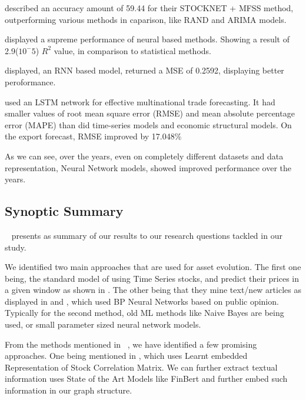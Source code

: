 \documentclass[11pt]{article}
\begin{document}
\cite{haq2021} described an accuracy amount of 59.44 for their STOCKNET + MFSS method, outperforming various methods in caparison, like RAND and ARIMA models.

\cite{Li2020} displayed a supreme performance of neural based methods. Showing a result of 2.9($10^-5$) $R^2$ value, in comparison to statistical methods.

\cite{qiu2020} displayed, an RNN based model, returned a MSE of 0.2592, displaying better peroformance. 

 \cite{shen2021} used an LSTM network for effective multinational trade forecasting. It had smaller values of root mean square error (RMSE) and mean absolute percentage error (MAPE) than did time-series models and economic structural models. On the export forecast, RMSE improved by 17.048\%

 As we can see, over the years, even on completely different datasets and data representation, Neural Network models, showed improved performance over the years.

 \subsection{Synoptic Summary}
~ presents as summary of our results to our research questions tackled in our study.

We identified two main approaches that are used for asset evolution. The first one being, the standard model of using Time Series stocks, and predict their prices in a given window as shown in \cite{dhafer2021}. The other being that they mine text/new articles as displayed in \cite{Gidfalvi2001UsingNA} and \cite{dhafer2021}, which used BP Neural Networks based on public opinion. Typically for the second method, old ML methods like Naive Bayes are being used, or small parameter sized neural network models.

From the methods mentioned in ~, we have identified a few promising approaches. One being mentioned in \cite{sarmah2022}, which uses Learnt embedded Representation of Stock Correlation Matrix. We can further extract textual information uses State of the Art Models like FinBert and further embed such information in our graph structure. 
 
\end{document}
